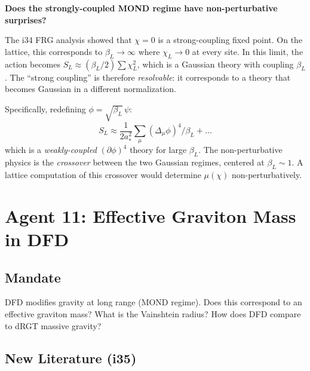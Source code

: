 \documentclass[11pt,a4paper]{article}
\begin{document}
\textbf{Does the strongly-coupled MOND regime have non-perturbative surprises?}

The i34 FRG analysis showed that $\chi = 0$ is a strong-coupling fixed point. On the lattice, this corresponds to $\beta_L \to \infty$ where $\chi_L \to 0$ at every site. In this limit, the action becomes $S_L \approx (\beta_L/2)\sum\chi_L^2$, which is a Gaussian theory with coupling $\beta_L$. The ``strong coupling'' is therefore \emph{resolvable}: it corresponds to a theory that becomes Gaussian in a different normalization.

Specifically, redefining $\phi = \sqrt{\beta_L}\,\psi$:
\begin{equation}
S_L \approx \frac{1}{2a_*^2}\sum_\mu(\Delta_\mu\phi)^4 / \beta_L + \ldots
\end{equation}
which is a \emph{weakly-coupled} $(\partial\phi)^4$ theory for large $\beta_L$. The non-perturbative physics is the \emph{crossover} between the two Gaussian regimes, centered at $\beta_L \sim 1$. A lattice computation of this crossover would determine $\mu(\chi)$ non-perturbatively.

\newpage
\section{Agent 11: Effective Graviton Mass in DFD}
\label{sec:agent11}

\subsection{Mandate}

DFD modifies gravity at long range (MOND regime). Does this correspond to an effective graviton mass? What is the Vainshtein radius? How does DFD compare to dRGT massive gravity?

\subsection{New Literature (i35)}
\end{document}
